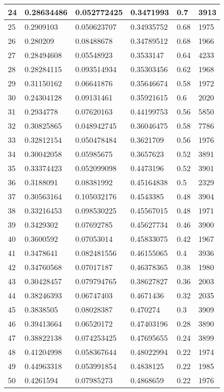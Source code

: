 \begin{longtable}{|l|l|l|l|l|l|}
24 & 0.28634486 & 0.052772425 & 0.3471993 & 0.7 & 3913 \\ \hline 
25 & 0.2909103 & 0.050623707 & 0.34935752 & 0.68 & 1975 \\ \hline 
26 & 0.280209 & 0.08488678 & 0.34789512 & 0.68 & 1966 \\ \hline 
27 & 0.28494608 & 0.05548923 & 0.3533147 & 0.64 & 4233 \\ \hline 
28 & 0.28284115 & 0.093514934 & 0.35303456 & 0.62 & 1968 \\ \hline 
29 & 0.31150162 & 0.06641876 & 0.35646674 & 0.58 & 1972 \\ \hline 
30 & 0.24304128 & 0.09131461 & 0.35921615 & 0.6 & 2020 \\ \hline 
31 & 0.2934778 & 0.07620163 & 0.44199753 & 0.56 & 5850 \\ \hline 
32 & 0.30825865 & 0.048942745 & 0.36046475 & 0.58 & 7786 \\ \hline 
33 & 0.32812154 & 0.050478484 & 0.3621709 & 0.56 & 1976 \\ \hline 
34 & 0.30042058 & 0.05985675 & 0.3657623 & 0.52 & 3891 \\ \hline 
35 & 0.33374423 & 0.052099098 & 0.4473196 & 0.52 & 3901 \\ \hline 
36 & 0.3188091 & 0.08381992 & 0.45164838 & 0.5 & 2329 \\ \hline 
37 & 0.30563164 & 0.105032176 & 0.4543385 & 0.48 & 3904 \\ \hline 
38 & 0.33216453 & 0.098530225 & 0.45567015 & 0.48 & 1971 \\ \hline 
39 & 0.3429302 & 0.07692785 & 0.45627734 & 0.46 & 3900 \\ \hline 
40 & 0.3600592 & 0.07053014 & 0.45833075 & 0.42 & 1967 \\ \hline 
41 & 0.3478641 & 0.082481556 & 0.46155065 & 0.4 & 3936 \\ \hline 
42 & 0.34760568 & 0.07017187 & 0.46378365 & 0.38 & 1980 \\ \hline 
43 & 0.30428457 & 0.079794765 & 0.38627827 & 0.36 & 2003 \\ \hline 
44 & 0.38246393 & 0.06747403 & 0.4671436 & 0.32 & 2035 \\ \hline 
45 & 0.3838505 & 0.08028387 & 0.470274 & 0.3 & 3909 \\ \hline 
46 & 0.39413664 & 0.06520172 & 0.47403196 & 0.28 & 3890 \\ \hline 
47 & 0.38822138 & 0.074253425 & 0.47695655 & 0.24 & 3899 \\ \hline 
48 & 0.41204998 & 0.058367644 & 0.48022994 & 0.22 & 1974 \\ \hline 
49 & 0.44963318 & 0.053991854 & 0.4838125 & 0.22 & 1985 \\ \hline 
50 & 0.4261594 & 0.07985273 & 0.4868659 & 0.22 & 1976 \\ \hline 
\end{longtable}